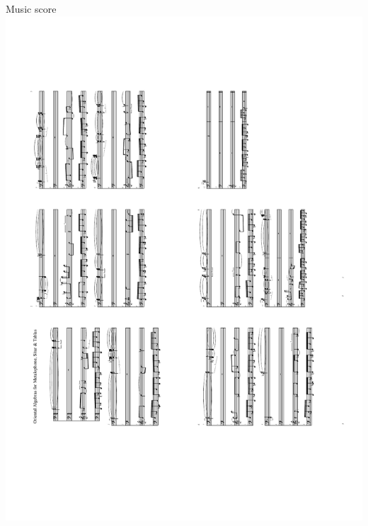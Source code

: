 \documentclass{beamer}
\begin{document}
	\begin{frame}[c]{Music score}
	\centering
	\includegraphics[scale=.38,angle=-90]{oriental.pdf}
	\end{frame}
  	
\end{document}
